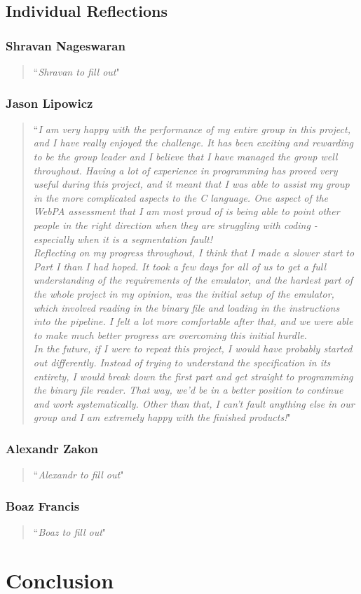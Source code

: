 \documentclass[11pt]{article}
\let\LaTeXsubsection\subsubsection
\def\subsubsection{\setlength{\parindent}{5mm}\LaTeXsubsection}
\begin{document}
\subsection{Individual Reflections}

\subsubsection{Shravan Nageswaran} 
\begin{quote}
``\textit{Shravan to fill out}"
\end{quote}


\subsubsection{Jason Lipowicz}
\begin{quote}
``\textit{I am very happy with the performance of my entire group in this project, and I have really enjoyed the challenge. It has been exciting and rewarding to be the group leader and I believe that I have managed the group well throughout. Having a lot of experience in programming has proved very useful during this project, and it meant that I was able to assist my group in the more complicated aspects to the C language. One aspect of the WebPA assessment that I am most proud of is being able to point other people in the right direction when they are struggling with coding - especially when it is a segmentation fault!} 
\textit{\\Reflecting on my progress throughout, I think that I made a slower start to Part I than I had hoped. It took a few days for all of us to get a full understanding of the requirements of the emulator, and the hardest part of the whole project in my opinion, was the initial setup of the emulator, which involved reading in the binary file and loading in the instructions into the \emph{pipeline}. I felt a lot more comfortable after that, and we were able to make much better progress are overcoming this initial hurdle.} 
\textit {\\In the future, if I were to repeat this project, I would have probably started out differently. Instead of trying to understand the  specification in its entirety, I would break down the first part and get straight to programming the binary file reader. That way, we'd be in a better position to continue and work systematically. Other than that, I can't fault anything else in our group and I am extremely happy with the finished products!}"
\end{quote}

\subsubsection{Alexandr Zakon} 
\begin{quote}
``\textit{Alexandr to fill out}"
\end{quote}


\subsubsection{Boaz Francis}
\begin{quote}
``\textit{Boaz to fill out}"
\end{quote}

\section{Conclusion}
\end{document}
